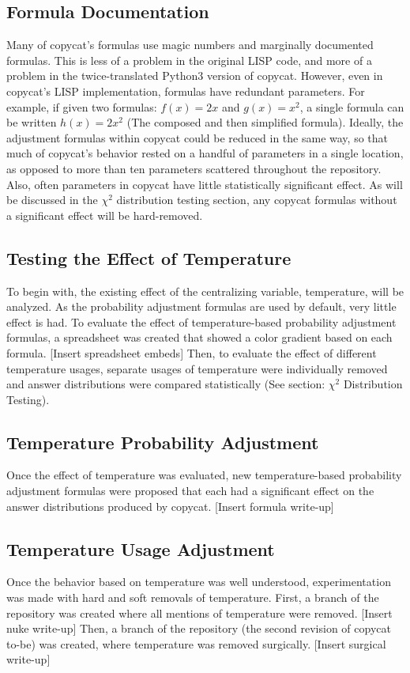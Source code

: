 \documentclass[a4paper]{article}
\begin{document}
    \subsection{Formula Documentation}
        Many of copycat's formulas use magic numbers and marginally documented formulas.
        This is less of a problem in the original LISP code, and more of a problem in the twice-translated Python3 version of copycat.
        However, even in copycat's LISP implementation, formulas have redundant parameters.
        For example, if given two formulas: $f(x) = 2x$ and $g(x) = x^2$, a single formula can be written $h(x) = 2x^2$ (The composed and then simplified formula).
        Ideally, the adjustment formulas within copycat could be reduced in the same way, so that much of copycat's behavior rested on a handful of parameters in a single location, as opposed to more than ten parameters scattered throughout the repository.
        Also, often parameters in copycat have little statistically significant effect.
        As will be discussed in the $\chi^2$ distribution testing section, any copycat formulas without a significant effect will be hard-removed.
    \subsection{Testing the Effect of Temperature}
        To begin with, the existing effect of the centralizing variable, temperature, will be analyzed.
        As the probability adjustment formulas are used by default, very little effect is had.
        To evaluate the effect of temperature-based probability adjustment formulas, a spreadsheet was created that showed a color gradient based on each formula.
        [Insert spreadsheet embeds]
        Then, to evaluate the effect of different temperature usages, separate usages of temperature were individually removed and answer distributions were compared statistically (See section: $\chi^2$ Distribution Testing).
    \subsection{Temperature Probability Adjustment}
        Once the effect of temperature was evaluated, new temperature-based probability adjustment formulas were proposed that each had a significant effect on the answer distributions produced by copycat.
        [Insert formula write-up]
    \subsection{Temperature Usage Adjustment}
        Once the behavior based on temperature was well understood, experimentation was made with hard and soft removals of temperature.
        First, a branch of the repository was created where all mentions of temperature were removed.
        [Insert nuke write-up]
        Then, a branch of the repository (the second revision of copycat to-be) was created, where temperature was removed surgically.
        [Insert surgical write-up]
\end{document}
